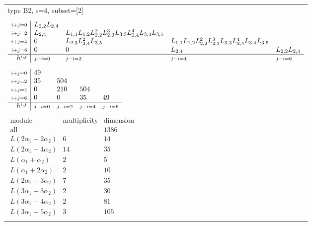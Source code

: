 \documentclass[crop,border=2mm]{standalone}
\begin{document}
\begin{tabular}{l}
{\huge type B2, s=4, subset=[2]}\\ \\


$\displaystyle
\begin{array}{r|l l l l}
	{\scriptstyle i+j=0}&L_{2,2}L_{2,4}&&&\\
	{\scriptstyle i+j=2}&L_{2,4}&L_{1,1}L_{1,2}L_{2,2}^{2}L_{2,3}^{3}L_{3,3}L_{2,4}^{4}L_{3,4}L_{3,5}&&\\
	{\scriptstyle i+j=4}&0&L_{2,3}L_{2,4}^{2}L_{3,5}&L_{1,1}L_{1,2}L_{2,2}^{2}L_{2,3}^{3}L_{3,3}L_{2,4}^{4}L_{3,4}L_{3,5}&\\
	{\scriptstyle i+j=6}&0&0&L_{2,4}&L_{2,2}L_{2,4}\\
	\hline h^{i,j}&{\scriptstyle j-i=0}&{\scriptstyle j-i=2}&{\scriptstyle j-i=4}&{\scriptstyle j-i=6}
\end{array}
$ \\ \\


$\displaystyle
\begin{array}{r|l l l l}
	{\scriptstyle i+j=0}&49&&&\\
	{\scriptstyle i+j=2}&35&504&&\\
	{\scriptstyle i+j=4}&0&210&504&\\
	{\scriptstyle i+j=6}&0&0&35&49\\
	\hline h^{i,j}&{\scriptstyle j-i=0}&{\scriptstyle j-i=2}&{\scriptstyle j-i=4}&{\scriptstyle j-i=6}
\end{array}
$ \\ \\


$\displaystyle
\begin{array}{rll}
	\text{module}&\text{multiplicity}&\text{dimension} \\ \hline \text{all}&&1386 \\
	L\left( 2\alpha_{1}+ 2\alpha_{2}\right)&6&14\\
	L\left( 2\alpha_{1}+ 4\alpha_{2}\right)&14&35\\
	L\left(\alpha_{1}+\alpha_{2}\right)&2&5\\
	L\left(\alpha_{1}+ 2\alpha_{2}\right)&2&10\\
	L\left( 2\alpha_{1}+ 3\alpha_{2}\right)&7&35\\
	L\left( 3\alpha_{1}+ 3\alpha_{2}\right)&2&30\\
	L\left( 3\alpha_{1}+ 4\alpha_{2}\right)&2&81\\
	L\left( 3\alpha_{1}+ 5\alpha_{2}\right)&3&105
\end{array}
$ \\ \\

\end{tabular}
\end{document}

